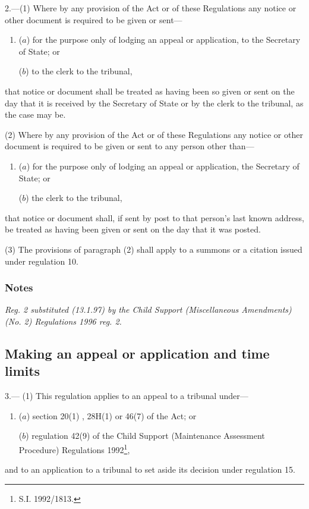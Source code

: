 \documentclass[a4paper]{article}
\newcommand\amendment[1]{\subsubsection*{Notes}{\itshape\frenchspacing\footnotesize #1 \par}}
\begin{document}
2.—(1) Where by any provision of the Act or of these Regulations any notice or other document is required to be given or sent—
\begin{enumerate}\item[]
($a$) for the purpose only of lodging an appeal or application, to the Secretary of State; or

($b$) to the clerk to the tribunal,
\end{enumerate}
that notice or document shall be treated as having been so given or sent on the day that it is received by the Secretary of State or by the clerk to the tribunal, as the case may be.

(2) Where by any provision of the Act or of these Regulations any notice or other document is required to be given or sent to any person other than—
\begin{enumerate}\item[]
($a$) for the purpose only of lodging an appeal or application, the Secretary of State; or

($b$) the clerk to the tribunal,
\end{enumerate}
that notice or document shall, if sent by post to that person’s last known address, be treated as having been given or sent on the day that it was posted.

(3) The provisions of paragraph (2) shall apply to a summons or a citation issued under regulation 10.

\amendment{
Reg. 2 substituted (13.1.97) by the Child Support (Miscellaneous Amendments) (No. 2) Regulations 1996 reg. 2.
}

\subsection[3. Making an appeal or application and time limits]{Making an appeal or application and time limits}

3.—%
(1) This regulation applies to an appeal to a tribunal under—
\begin{enumerate}\item[]
($a$) section 20(1)%
, 28H(1)  %
or 46(7) of the Act; or

($b$) regulation 42(9) of the Child Support (Maintenance Assessment Procedure) Regulations 1992\footnote{\frenchspacing S.I. 1992/1813.},
\end{enumerate}
and to an application to a tribunal to set aside its decision under regulation 15.
\end{document}
